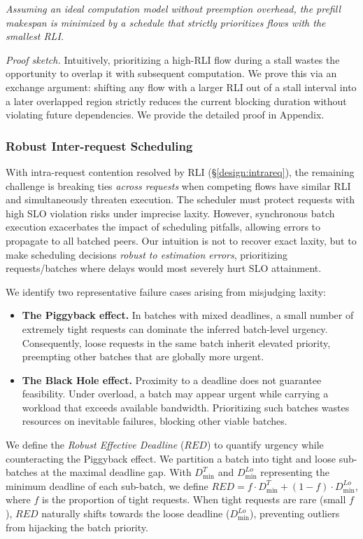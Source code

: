   \emph{Assuming an ideal computation model without preemption overhead, the prefill makespan is minimized by a schedule that strictly prioritizes flows with the smallest RLI.}

\emph{Proof sketch.} Intuitively, prioritizing a high-RLI flow during a stall wastes the opportunity to overlap it with subsequent computation. We prove this via an exchange argument: shifting any flow with a larger RLI out of a stall interval into a later overlapped region strictly reduces the current blocking duration without violating future dependencies. We provide the detailed proof in Appendix.

\subsubsection{Robust Inter-request Scheduling}\label{design:interreq}

With intra-request contention resolved by RLI (\S\ref{design:intrareq}), the remaining challenge is breaking ties \emph{across requests} when competing flows have similar RLI and simultaneously threaten execution. The scheduler must protect requests with high SLO violation risks under imprecise laxity. However, synchronous batch execution exacerbates the impact of scheduling pitfalls, allowing errors to propagate to all batched peers. Our intuition is not to recover exact laxity, but to make scheduling decisions \emph{robust to estimation errors}, prioritizing requests/batches where delays would most severely hurt SLO attainment.

We identify two representative failure cases arising from misjudging laxity:
\begin{itemize}[leftmargin=*]
    \item \textbf{The Piggyback effect.} In batches with mixed deadlines, a small number of extremely tight requests can dominate the inferred batch-level urgency. Consequently, loose requests in the same batch inherit elevated priority, preempting other batches that are globally more urgent.
    \item \textbf{The Black Hole effect.} Proximity to a deadline does not guarantee feasibility. Under overload, a batch may appear urgent while carrying a workload that exceeds available bandwidth. Prioritizing such batches wastes resources on inevitable failures, blocking other viable batches.
\end{itemize}

We define the \emph{Robust Effective Deadline} ($RED$) to quantify urgency while counteracting the Piggyback effect. We partition a batch into tight and loose sub-batches at the maximal deadline gap. With $D^T_{\text{min}}$ and $D^{Lo}_{\text{min}}$ representing the minimum deadline of each sub-batch, we define $RED = f \cdot D^T_{\text{min}} + (1-f) \cdot D^{Lo}_{\text{min}}$, where $f$ is the proportion of tight requests. When tight requests are rare (small $f$), $RED$ naturally shifts towards the loose deadline ($D^{Lo}_{\min}$), preventing outliers from hijacking the batch priority.

